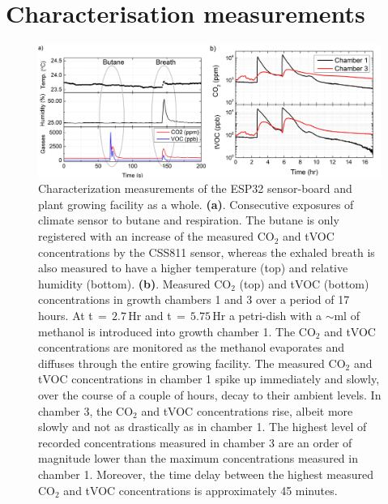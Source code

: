 \documentclass[reprint,superscriptaddress,aps,amsmath,amssymb]{revtex4-1}
\begin{document}
\section{Characterisation measurements}
\begin{figure}
    \centering
    \includegraphics[width = \textwidth]{test_measurements.jpg}
    \caption{Characterization measurements of the ESP32 sensor-board and plant growing facility as a whole. \textbf{(a)}.  Consecutive exposures of climate sensor to butane and respiration. The butane is only registered with an increase of the measured CO$_2$ and tVOC concentrations by the CSS811 sensor, whereas the exhaled breath is also measured to have a higher temperature (top) and relative humidity (bottom). \textbf{(b)}. Measured CO$_{2}$ (top) and tVOC (bottom) concentrations in growth chambers 1 and 3 over a period of 17 hours. At t$\,=\,2.7$\,Hr and t$\,=\,5.75$\,Hr a petri-dish with a $\sim$ml of methanol is introduced into growth chamber 1. The CO$_{2}$ and tVOC concentrations are monitored as the methanol evaporates and diffuses through the entire growing facility. The measured CO$_{2}$ and tVOC concentrations in chamber 1 spike up immediately and slowly, over the course of a couple of hours, decay to their ambient levels. In chamber 3, the CO$_{2}$ and tVOC concentrations rise, albeit more slowly and not as drastically as in chamber 1. The highest level of recorded concentrations measured in chamber 3 are an order of magnitude lower than the maximum concentrations measured in chamber 1. Moreover, the time delay between the highest measured CO$_2$ and tVOC concentrations is approximately 45 minutes.}
    \label{fig: baseline Butane and leaktesting}
\end{figure}
\end{document}
